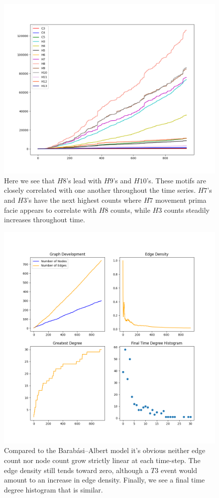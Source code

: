 \begin{figure}[h!]
    \includegraphics[width=15cm]{Images/twitter_sim_for_stats_3_0.2_0.2.png}
    \centering
    \caption{Here we see that $H8$'s lead with $H9$'s and $H10$'s. These motifs are
     closely correlated with one another throughout the time series. $H7$'s
    and $H3$'s have the next highest counts where $H7$ movement prima facie
    appears to correlate with $H8$ counts, while $H3$ counts steadily increases throughout time.}
    \label{fig:thij0202}
\end{figure}

\begin{figure}[h!]
    \includegraphics[width=14cm]{Images/twitter_sim_stats_3_0.2_0.2.png}
    \centering
    \caption{Compared to the Barabási–Albert model it's obvious neither edge count nor node
     count grow strictly linear at each time-step. The edge density still tends toward
     zero, although a $T3$ event would amount to an increase in edge density. Finally, we 
    see a final time degree histogram that is similar.}
\end{figure}

